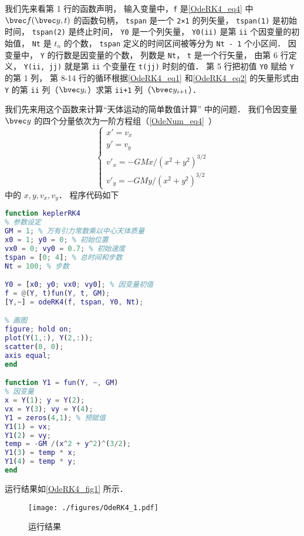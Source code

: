 我们先来看第 1 行的函数声明， 输入变量中，\verb|f| 是\autoref{OdeRK4_eq4} 中 $\bvec f(\bvec y, t)$ 的函数句柄， \verb|tspan| 是一个 \verb|2×1| 的列矢量， \verb|tspan(1)| 是初始时间， \verb|tspan(2)| 是终止时间， \verb|Y0| 是一个列矢量， \verb|Y0(ii)| 是第 \verb|ii| 个因变量的初始值， \verb|Nt| 是 $t_n$ 的个数， \verb|tspan| 定义的时间区间被等分为 \verb|Nt - 1| 个小区间． 因变量中， \verb|Y| 的行数是因变量的个数， 列数是 \verb|Nt|， \verb|t| 是一个行矢量， 由第 6 行定义， \verb|Y(ii, jj)| 就是第 \verb|ii| 个变量在 \verb|t(jj)| 时刻的值． 第 5 行把初值 \verb|Y0| 赋给 \verb|Y| 的第 1 列， 第 8-14 行的循环根据\autoref{OdeRK4_eq1} 和\autoref{OdeRK4_eq2} 的矢量形式由 \verb|Y| 的第 \verb|ii| 列（$\bvec y_i$）求第 \verb|ii+1| 列（$\bvec y_{i+1}$）．

我们先来用这个函数来计算“天体运动的简单数值计算” 中的问题． 我们令因变量 $\bvec y$ 的四个分量依次为一阶方程组（\autoref{OdeNum_eq4}~）
\begin{equation}\label{OdeRK4_eq5}
\begin{cases}
x' = v_x\\
y' = v_y\\
v'_x = -GMx/(x^2 + y^2)^{3/2}\\
v'_y = -GMy/(x^2 + y^2)^{3/2}
\end{cases}
\end{equation}
中的 $x, y, v_x, v_y$． 程序代码如下

\begin{lstlisting}[language=matlab, caption=keplerRK4.m]
function keplerRK4
% 参数设定
GM = 1; % 万有引力常数乘以中心天体质量
x0 = 1; y0 = 0; % 初始位置
vx0 = 0; vy0 = 0.7; % 初始速度
tspan = [0; 4]; % 总时间和步数
Nt = 100; % 步数

Y0 = [x0; y0; vx0; vy0]; % 因变量初值
f = @(Y, t)fun(Y, t, GM);
[Y,~] = odeRK4(f, tspan, Y0, Nt);

% 画图
figure; hold on;
plot(Y(1,:), Y(2,:));
scatter(0, 0);
axis equal;
end

function Y1 = fun(Y, ~, GM)
% 因变量
x = Y(1); y = Y(2);
vx = Y(3); vy = Y(4);
Y1 = zeros(4,1); % 预赋值
Y1(1) = vx;
Y1(2) = vy;
temp = -GM /(x^2 + y^2)^(3/2);
Y1(3) = temp * x;
Y1(4) = temp * y;
end
\end{lstlisting}

运行结果如\autoref{OdeRK4_fig1} 所示．

\begin{figure}[ht]
\centering
\texttt{[image: ./figures/OdeRK4\_1.pdf]}
\caption{运行结果} \label{OdeRK4_fig1}
\end{figure}

